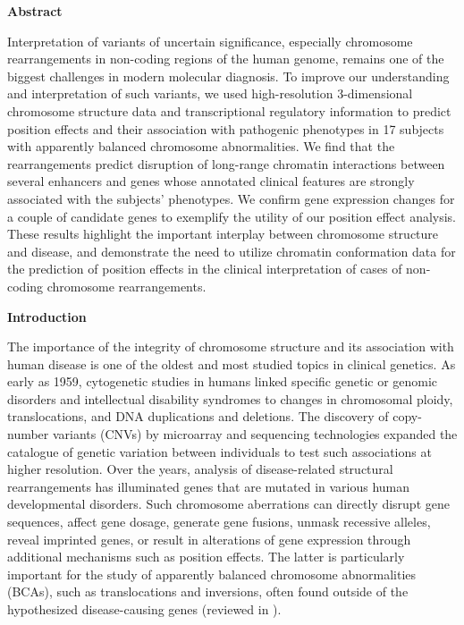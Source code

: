 \documentclass[a4paper,twoside=true,openright,parskip=full,chapterprefix=true,11pt,headings=normal,bibliography=totoc,listof=totoc,titlepage=on,captions=tableabove,draft=false]{scrreprt}
\theoremstyle{definition}
\theoremstyle{definition}
\theoremstyle{definition}
\theoremstyle{remark}
\begin{document}
\textbf{Abstract}

Interpretation of variants of uncertain significance, especially
chromosome rearrangements in non-coding regions of the human genome,
remains one of the biggest challenges in modern molecular diagnosis. To
improve our understanding and interpretation of such variants, we used
high-resolution 3-dimensional chromosome structure data and
transcriptional regulatory information to predict position effects and
their association with pathogenic phenotypes in 17 subjects with
apparently balanced chromosome abnormalities. We find that the
rearrangements predict disruption of long-range chromatin interactions
between several enhancers and genes whose annotated clinical features
are strongly associated with the subjects' phenotypes. We confirm gene
expression changes for a couple of candidate genes to exemplify the
utility of our position effect analysis. These results highlight the
important interplay between chromosome structure and disease, and
demonstrate the need to utilize chromatin conformation data for the
prediction of position effects in the clinical interpretation of cases
of non-coding chromosome rearrangements.

\textbf{Introduction}

The importance of the integrity of chromosome structure and its
association with human disease is one of the oldest and most studied
topics in clinical genetics. As early as 1959, cytogenetic studies in
humans linked specific genetic or genomic disorders and intellectual
disability syndromes to changes in chromosomal ploidy, translocations,
and DNA duplications and
deletions.\citep{Iafrate2004, Sebat2004, Conrad2006, Hinds2006, Conrad2010}
The discovery of copy-number variants (CNVs) by microarray and
sequencing technologies expanded the catalogue of genetic variation
between individuals to test such associations at higher
resolution.\citep[
HapMap2010]{Iafrate2004, Sebat2004, Conrad2006, McCarroll2006, Hinds2006, Conrad2010, Korbel2007, Alkan2009, Chen2009, McKernan2009, Sudmant2010, International}
Over the years, analysis of disease-related structural rearrangements
has illuminated genes that are mutated in various human developmental
disorders.\citep{Zhang2009, Theisen2010, Nambiar2011} Such chromosome
aberrations can directly disrupt gene sequences, affect gene dosage,
generate gene fusions, unmask recessive alleles, reveal imprinted genes,
or result in alterations of gene expression through additional
mechanisms such as position effects.\citep{Zhang2009} The latter is
particularly important for the study of apparently balanced chromosome
abnormalities (BCAs), such as translocations and inversions, often found
outside of the hypothesized disease-causing genes (reviewed in
\citep{Kleinjan2005}).
\end{document}
